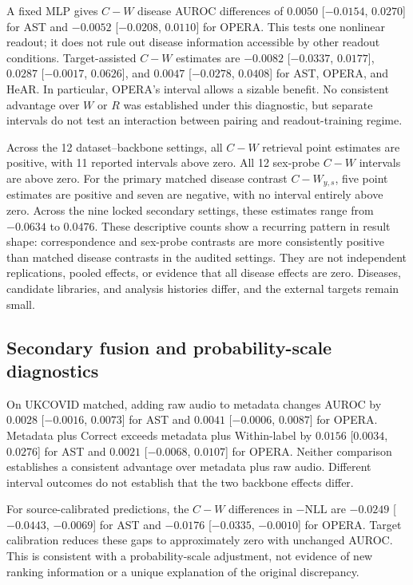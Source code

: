 \documentclass{article}
\newcommand{\wys}{\ensuremath{W_{y,s}}}
\begin{document}
A fixed MLP gives $C-W$ disease AUROC differences of
$0.0050$ [$-0.0154$, $0.0270$] for AST and
$-0.0052$ [$-0.0208$, $0.0110$] for OPERA. This tests one nonlinear readout;
it does not rule out disease information accessible by other readout
conditions.
Target-assisted $C-W$ estimates are
$-0.0082$ [$-0.0337$, $0.0177$],
$0.0287$ [$-0.0017$, $0.0626$], and
$0.0047$ [$-0.0278$, $0.0408$] for AST, OPERA, and HeAR.
In particular, OPERA's interval allows a sizable benefit. No consistent
advantage over $W$ or $R$ was established under this diagnostic, but separate
intervals do not test an interaction between pairing and readout-training
regime.

Across the 12 dataset--backbone settings, all $C-W$ retrieval point estimates
are positive, with 11 reported intervals above zero. All 12 sex-probe
$C-W$ intervals are above zero. For the primary matched disease contrast
$C-\wys{}$, five point estimates are positive and seven are negative, with no
interval entirely above zero. Across the nine locked secondary settings, these
estimates range from $-0.0634$ to $0.0476$. These descriptive counts show a
recurring pattern in result shape: correspondence and sex-probe contrasts are
more consistently positive than matched disease contrasts in the audited
settings. They are not independent replications, pooled effects, or evidence
that all disease effects are zero. Diseases, candidate libraries, and analysis
histories differ, and the external targets remain small.


\subsection{Secondary fusion and probability-scale diagnostics}

On UKCOVID matched, adding raw audio to metadata changes AUROC by
$0.0028$ [$-0.0016$, $0.0073$] for AST and
$0.0041$ [$-0.0006$, $0.0087$] for OPERA.
Metadata plus Correct exceeds metadata plus Within-label by
$0.0156$ [$0.0034$, $0.0276$] for AST and
$0.0021$ [$-0.0068$, $0.0107$] for OPERA.
Neither comparison establishes a consistent advantage over metadata plus
raw audio. Different interval outcomes do not establish that the two
backbone effects differ.

For source-calibrated predictions, the $C-W$ differences in
$-\mathrm{NLL}$ are $-0.0249$ [$-0.0443$, $-0.0069$] for AST and
$-0.0176$ [$-0.0335$, $-0.0010$] for OPERA. Target calibration reduces these
gaps to approximately zero with unchanged AUROC. This is consistent with a
probability-scale adjustment, not evidence of new ranking information or a
unique explanation of the original discrepancy.
\end{document}
